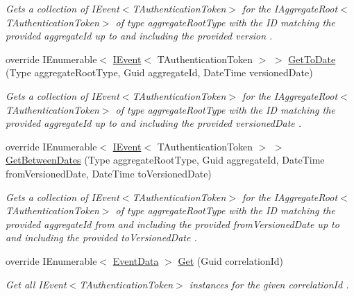 \begin{DoxyCompactItemize}
\begin{DoxyCompactList}\small\item\em Gets a collection of I\+Event$<$\+T\+Authentication\+Token$>$ for the I\+Aggregate\+Root$<$\+T\+Authentication\+Token$>$ of type {\itshape aggregate\+Root\+Type}  with the ID matching the provided {\itshape aggregate\+Id}  up to and including the provided {\itshape version} . \end{DoxyCompactList}\item 
override I\+Enumerable$<$ \hyperlink{interfaceCqrs_1_1Events_1_1IEvent}{I\+Event}$<$ T\+Authentication\+Token $>$ $>$ \hyperlink{classCqrs_1_1Azure_1_1BlobStorage_1_1Events_1_1BlobStorageEventStore_a3c2ec49781bbcf7e0c2549133c160591_a3c2ec49781bbcf7e0c2549133c160591}{Get\+To\+Date} (Type aggregate\+Root\+Type, Guid aggregate\+Id, Date\+Time versioned\+Date)
\begin{DoxyCompactList}\small\item\em Gets a collection of I\+Event$<$\+T\+Authentication\+Token$>$ for the I\+Aggregate\+Root$<$\+T\+Authentication\+Token$>$ of type {\itshape aggregate\+Root\+Type}  with the ID matching the provided {\itshape aggregate\+Id}  up to and including the provided {\itshape versioned\+Date} . \end{DoxyCompactList}\item 
override I\+Enumerable$<$ \hyperlink{interfaceCqrs_1_1Events_1_1IEvent}{I\+Event}$<$ T\+Authentication\+Token $>$ $>$ \hyperlink{classCqrs_1_1Azure_1_1BlobStorage_1_1Events_1_1BlobStorageEventStore_acbb5dac5daaf2eafbf76ab631e7827f8_acbb5dac5daaf2eafbf76ab631e7827f8}{Get\+Between\+Dates} (Type aggregate\+Root\+Type, Guid aggregate\+Id, Date\+Time from\+Versioned\+Date, Date\+Time to\+Versioned\+Date)
\begin{DoxyCompactList}\small\item\em Gets a collection of I\+Event$<$\+T\+Authentication\+Token$>$ for the I\+Aggregate\+Root$<$\+T\+Authentication\+Token$>$ of type {\itshape aggregate\+Root\+Type}  with the ID matching the provided {\itshape aggregate\+Id}  from and including the provided {\itshape from\+Versioned\+Date}  up to and including the provided {\itshape to\+Versioned\+Date} . \end{DoxyCompactList}\item 
override I\+Enumerable$<$ \hyperlink{classCqrs_1_1Events_1_1EventData}{Event\+Data} $>$ \hyperlink{classCqrs_1_1Azure_1_1BlobStorage_1_1Events_1_1BlobStorageEventStore_a660c786205693ee34a11e205c6d136ad_a660c786205693ee34a11e205c6d136ad}{Get} (Guid correlation\+Id)
\begin{DoxyCompactList}\small\item\em Get all I\+Event$<$\+T\+Authentication\+Token$>$ instances for the given {\itshape correlation\+Id} . \end{DoxyCompactList}\end{DoxyCompactItemize}
